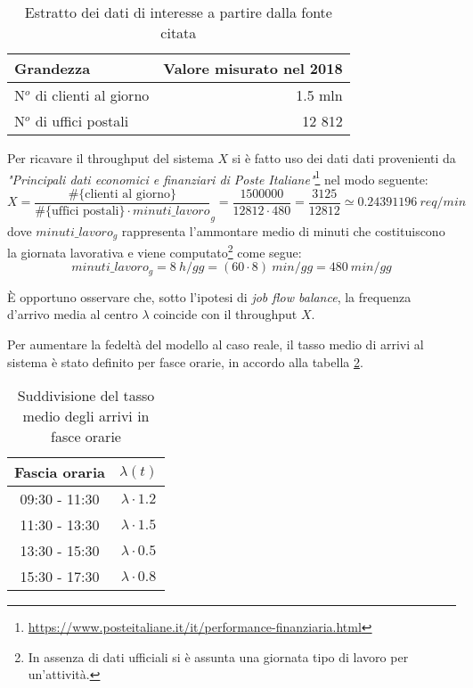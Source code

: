 \begin{table}[ht]
\centering
{\tablecolors
\begin{tabular}{| l | r |}
\hline
Grandezza & Valore misurato nel 2018 \\
\hline
N$^o$ di clienti al giorno & 1.5 mln \\
\hline
N$^o$ di uffici postali & 12 812 \\
\hline
\end{tabular}}
\caption{Estratto dei dati di interesse a partire dalla fonte citata}
\label{table:modello-specifiche-2}
\end{table}

Per ricavare il throughput del sistema $X$ si è fatto uso dei dati dati provenienti da \textsl{"Principali dati economici e finanziari di Poste Italiane"}\footnote{\url{https://www.posteitaliane.it/it/performance-finanziaria.html}} nel modo seguente:
\begin{equation}
X = \frac{\# \lbrace \text{clienti al giorno} \rbrace}{\# \lbrace \text{uffici postali} \rbrace \cdot minuti\_lavoro}_{g} = \frac{1500000}{12812\cdot 480} = \frac{3125}{12812} \simeq 0.24391196\ req/min
\end{equation} 
dove $minuti\_lavoro_{g}$ rappresenta l'ammontare medio di minuti che costituiscono la giornata lavorativa e viene computato\footnote{In assenza di dati ufficiali si è assunta una giornata tipo di lavoro per un'attività.} come segue:
\begin{equation}
\label{eqn:modello-specifiche-15}
minuti\_lavoro_{g} = 8\ h/gg = (60 \cdot 8)\ min/gg = 480\ min/gg
\end{equation}

È opportuno osservare che, sotto l'ipotesi di \textsl{job flow balance}, la frequenza d'arrivo media al centro $\lambda$ coincide con il throughput $X$.

Per aumentare la fedeltà del modello al caso reale, il tasso medio di arrivi al sistema è stato definito per fasce orarie, in accordo alla tabella \ref{table:modello-specifiche-3}.

\begin{table}[ht]
\centering
{\tablecolors
\begin{tabular}{| c | c |}
\hline
Fascia oraria & $\lambda(t)$ \\
\hline
09:30 - 11:30 & $\lambda \cdot 1.2$ \\
\hline
11:30 - 13:30 & $\lambda \cdot 1.5$ \\
\hline
13:30 - 15:30 & $\lambda \cdot 0.5$ \\
\hline
15:30 - 17:30 & $\lambda \cdot 0.8$ \\
\hline
\end{tabular}}
\caption{Suddivisione del tasso medio degli arrivi in fasce orarie}
\label{table:modello-specifiche-3}
\end{table}
















